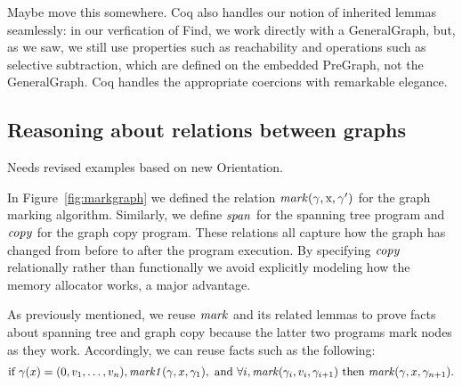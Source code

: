 {\color{blue} Maybe move this somewhere.} 
Coq also handles our notion of inherited 
lemmas seamlessly: in our verfication of Find, we 
work directly with a  GeneralGraph, but, as 
we saw, we still use properties such as reachability 
and operations such as selective subtraction, which are defined on the 
embedded PreGraph, not the GeneralGraph. 
Coq handles the appropriate coercions with 
remarkable elegance.


\subsection{Reasoning about relations between graphs} %

{\color{blue}Needs revised examples based on new Orientation.}

In Figure~\ref{fig:markgraph} we defined the relation 
$\mathit{mark}(\gamma, \text{x}, \gamma')$
for the graph marking algorithm.  Similarly, we define $\mathit{span}$ for the 
spanning tree program
and $\mathit{copy}$ for the graph copy program.
These relations all capture how the graph has changed from before to after the program
execution.  By specifying $\mathit{copy}$ relationally
rather than functionally we avoid explicitly modeling how the memory 
allocator works, a major advantage.

As previously mentioned, we reuse $\mathit{mark}$ and its
related lemmas to prove facts about spanning tree and graph copy
because the latter two programs mark nodes as they work.
Accordingly, we can reuse facts such as the following:
\[
\begin{array}{@{}l@{}}
\text{if } \gamma(x)=(0, v_1, \dots,v_n), \m{mark1}(\gamma, x, \gamma_1),
\text{ and } \forall i, \m{mark}(\gamma_i,v_i,\gamma_{i+1}) \text{ then } \m{mark}(\gamma,x,\gamma_{n+1}).
\end{array}
\]
